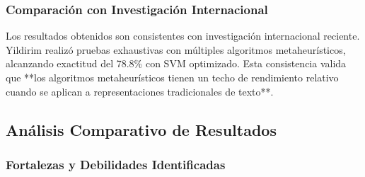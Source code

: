 \subsubsection{Comparación con Investigación Internacional}

Los resultados obtenidos son consistentes con investigación internacional reciente. Yildirim \cite{yildirim2023novel} realizó pruebas exhaustivas con múltiples algoritmos metaheurísticos, alcanzando exactitud del 78.8\% con SVM optimizado. Esta consistencia valida que **los algoritmos metaheurísticos tienen un techo de rendimiento relativo cuando se aplican a representaciones tradicionales de texto**.

\subsection{Análisis Comparativo de Resultados}
\label{subsec:analisis_comparativo}

\begin{table}[htbp]
\centering
{}
\caption{Resultados comparativos finales de los cinco algoritmos metaheurísticos implementados usando métricas macro promedio.}
\label{tab:resultados_comparativos_final}
\end{table}

\subsubsection{Fortalezas y Debilidades Identificadas}

